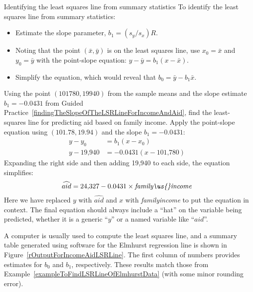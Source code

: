 \begin{onebox}{Identifying the least squares line from summary statistics}
To identify the least squares line from summary statistics:\vspace{-1mm}
\begin{itemize}
\setlength{\itemsep}{0mm}
\item
    Estimate the slope parameter, $b_1 = (s_y / s_x) R$.
\item
    Noting that the point $(\bar{x}, \bar{y})$ is on the least
    squares line, use $x_0 = \bar{x}$ and $y_0 = \bar{y}$ with
    the point-slope equation: $y - \bar{y} = b_1 (x - \bar{x})$.
\item
    Simplify the equation, which would reveal that
    $b_0 = \bar{y} - b_1 \bar{x}$.
\end{itemize}
\end{onebox}

\begin{examplewrap}
\begin{nexample}{Using the point $(101780, 19940)$
    from the sample means and the slope estimate
    $b_1 = -0.0431$ from Guided
    Practice~\ref{findingTheSlopeOfTheLSRLineForIncomeAndAid},
    find the least-squares line for predicting aid based
    on family income.}
  \label{exampleToFindLSRLineOfElmhurstData}%
  Apply the point-slope equation using $(101.78, 19.94)$
  and the slope $b_1 = -0.0431$:
  \begin{align*}
  y - y_0    &= b_1 (x - x_0) \\
  y - \text{19,940}  &= -0.0431(x - \text{101,780})
  \end{align*}
  Expanding the right side and then adding 19,940 to each side,
  the equation simplifies:
  \begin{align*}
  \widehat{aid} = \text{24,327} - 0.0431 \times
      \textit{family\us{}income}
  \end{align*}
  Here we have replaced $y$ with $\widehat{aid}$ and $x$ with
  \textit{family\us{}income} to put the equation in context.
  The final equation should always include a ``hat''
  on the variable being predicted, whether it is a generic
  ``$y$'' or a named variable like ``$aid$''.
\end{nexample}
\end{examplewrap}

A computer is usually used to compute the least squares line,
and a summary table generated using software for the Elmhurst
regression line is shown in
Figure~\ref{rOutputForIncomeAidLSRLine}.
The first column of numbers provides estimates for ${b}_0$
and ${b}_1$, respectively.
These results match those from
Example~\ref{exampleToFindLSRLineOfElmhurstData}
(with some minor rounding error).

